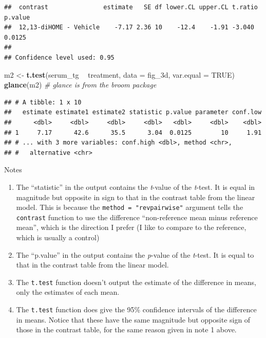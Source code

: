 \documentclass[]{book}
\newenvironment{Shaded}{\begin{snugshade}}{\end{snugshade}}
\newcommand{\CommentTok}[1]{\textcolor[rgb]{0.56,0.35,0.01}{\textit{#1}}}
\newcommand{\DataTypeTok}[1]{\textcolor[rgb]{0.13,0.29,0.53}{#1}}
\newcommand{\KeywordTok}[1]{\textcolor[rgb]{0.13,0.29,0.53}{\textbf{#1}}}
\newcommand{\NormalTok}[1]{#1}
\newcommand{\OperatorTok}[1]{\textcolor[rgb]{0.81,0.36,0.00}{\textbf{#1}}}
\newcommand{\OtherTok}[1]{\textcolor[rgb]{0.56,0.35,0.01}{#1}}
\newcommand{\StringTok}[1]{\textcolor[rgb]{0.31,0.60,0.02}{#1}}
\providecommand{\tightlist}{%
  \setlength{\itemsep}{0pt}\setlength{\parskip}{0pt}}
\begin{document}
\begin{verbatim}
##  contrast               estimate   SE df lower.CL upper.CL t.ratio p.value
##  12,13-diHOME - Vehicle    -7.17 2.36 10    -12.4    -1.91 -3.040  0.0125 
## 
## Confidence level used: 0.95
\end{verbatim}

\begin{Shaded}
\begin{Highlighting}[]
\NormalTok{m2 <-}\StringTok{ }\KeywordTok{t.test}\NormalTok{(serum_tg }\OperatorTok{~}\StringTok{ }\NormalTok{treatment,}
                \DataTypeTok{data =}\NormalTok{ fig_3d,}
                \DataTypeTok{var.equal =} \OtherTok{TRUE}\NormalTok{)}
\KeywordTok{glance}\NormalTok{(m2) }\CommentTok{# glance is from the broom package}
\end{Highlighting}
\end{Shaded}

\begin{verbatim}
## # A tibble: 1 x 10
##   estimate estimate1 estimate2 statistic p.value parameter conf.low
##      <dbl>     <dbl>     <dbl>     <dbl>   <dbl>     <dbl>    <dbl>
## 1     7.17      42.6      35.5      3.04  0.0125        10     1.91
## # ... with 3 more variables: conf.high <dbl>, method <chr>,
## #   alternative <chr>
\end{verbatim}

Notes

\begin{enumerate}
\def\labelenumi{\arabic{enumi}.}
\tightlist
\item
  The ``statistic'' in the output contains the \emph{t}-value of the \emph{t}-test. It is equal in magnitude but opposite in sign to that in the contrast table from the linear model. This is because the \texttt{method\ =\ "revpairwise"} argument tells the \texttt{contrast} function to use the difference ``non-reference mean minus reference mean'', which is the direction I prefer (I like to compare to the reference, which is usually a control)
\item
  The ``p.value'' in the output contains the \emph{p}-value of the \emph{t}-test. It is equal to that in the contrast table from the linear model.
\item
  The \texttt{t.test} function doesn't output the estimate of the difference in means, only the estimates of each mean.
\item
  The \texttt{t.test} function does give the 95\% confidence intervals of the difference in means. Notice that these have the same magnitude but opposite sign of those in the contrast table, for the same reason given in note 1 above.
\end{enumerate}
\end{document}
